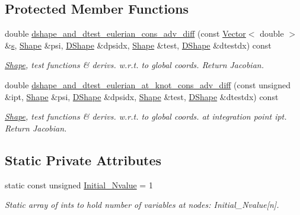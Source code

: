 \subsection*{Protected Member Functions}
\begin{DoxyCompactItemize}
\item 
double \hyperlink{classoomph_1_1QGeneralisedAdvectionDiffusionElement_ac3743f95fd8a381bb86b2a1fd08673f4}{dshape\+\_\+and\+\_\+dtest\+\_\+eulerian\+\_\+cons\+\_\+adv\+\_\+diff} (const \hyperlink{classoomph_1_1Vector}{Vector}$<$ double $>$ \&\hyperlink{cfortran_8h_ab7123126e4885ef647dd9c6e3807a21c}{s}, \hyperlink{classoomph_1_1Shape}{Shape} \&psi, \hyperlink{classoomph_1_1DShape}{D\+Shape} \&dpsidx, \hyperlink{classoomph_1_1Shape}{Shape} \&test, \hyperlink{classoomph_1_1DShape}{D\+Shape} \&dtestdx) const
\begin{DoxyCompactList}\small\item\em \hyperlink{classoomph_1_1Shape}{Shape}, test functions \& derivs. w.\+r.\+t. to global coords. Return Jacobian. \end{DoxyCompactList}\item 
double \hyperlink{classoomph_1_1QGeneralisedAdvectionDiffusionElement_a86385db741884733eb3ec459cc40290d}{dshape\+\_\+and\+\_\+dtest\+\_\+eulerian\+\_\+at\+\_\+knot\+\_\+cons\+\_\+adv\+\_\+diff} (const unsigned \&ipt, \hyperlink{classoomph_1_1Shape}{Shape} \&psi, \hyperlink{classoomph_1_1DShape}{D\+Shape} \&dpsidx, \hyperlink{classoomph_1_1Shape}{Shape} \&test, \hyperlink{classoomph_1_1DShape}{D\+Shape} \&dtestdx) const
\begin{DoxyCompactList}\small\item\em \hyperlink{classoomph_1_1Shape}{Shape}, test functions \& derivs. w.\+r.\+t. to global coords. at integration point ipt. Return Jacobian. \end{DoxyCompactList}\end{DoxyCompactItemize}
\subsection*{Static Private Attributes}
\begin{DoxyCompactItemize}
\item 
static const unsigned \hyperlink{classoomph_1_1QGeneralisedAdvectionDiffusionElement_a2ea29796b838cb53f0cfbc99a377274c}{Initial\+\_\+\+Nvalue} = 1
\begin{DoxyCompactList}\small\item\em Static array of ints to hold number of variables at nodes\+: Initial\+\_\+\+Nvalue\mbox{[}n\mbox{]}. \end{DoxyCompactList}\end{DoxyCompactItemize}
